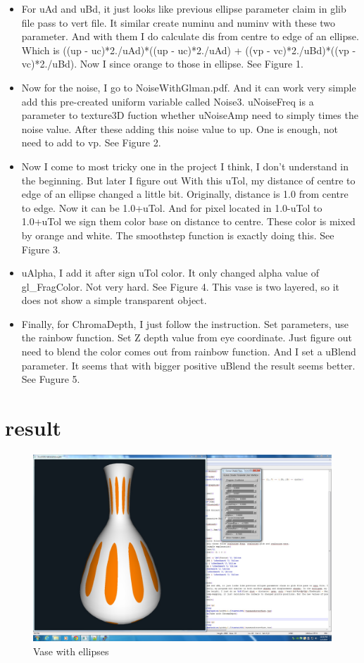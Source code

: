\documentclass[12pt,letterpaper]{article}
\begin{document}
\begin{itemize}
\item For uAd and uBd, it just looks like previous ellipse parameter claim in glib file pass to vert file. It similar create numinu and numinv with these two parameter. And with them I do calculate dis from centre to edge of an ellipse. Which is ((up - uc)*2./uAd)*((up - uc)*2./uAd) + ((vp - vc)*2./uBd)*((vp - vc)*2./uBd). Now I since orange to those in ellipse. See Figure 1.
\item Now for the noise, I go to NoiseWithGlman.pdf. And it can work very simple add this pre-created uniform variable called Noise3. uNoiseFreq is a parameter to texture3D fuction whether uNoiseAmp need to simply times the noise value. After these adding this noise value to up. One is enough, not need to add to vp. See Figure 2.
\item Now I come to most tricky one in the project I think, I don't understand in the beginning. But later I figure out With this uTol, my distance of centre to edge of an ellipse changed a little bit. Originally, distance is 1.0 from centre to edge. Now it can be 1.0+uTol. And for pixel located in 1.0-uTol to 1.0+uTol we sign them color base on distance to centre. These color is mixed by orange and white. The smoothstep function is exactly doing this. See Figure 3.
\item uAlpha, I add it after sign uTol color. It only changed alpha value of gl\_FragColor. Not very hard. See Figure 4. This vase is two layered, so it does not show a simple transparent object.
\item Finally, for ChromaDepth, I just follow the instruction. Set parameters, use the rainbow function. Set Z depth value from eye coordinate. Just figure out need to blend the color comes out from rainbow function. And I set a uBlend parameter. It seems that with bigger positive uBlend the result seems better. See Fugure 5. 
\end{itemize}
\section{result}

\begin{figure}[p]
    \centering
    \includegraphics[width=1.0\textwidth]{ellipse.jpg}
    \caption{Vase with ellipses}
\end{figure}
\end{document}

